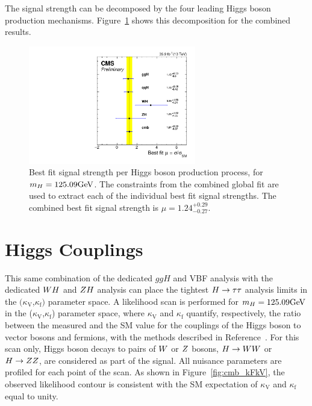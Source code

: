 The signal strength can be decomposed by the four leading Higgs boson production 
mechanisms. Figure~\ref{fig:cmb_mu_higgs_processes} shows this decomposition for
the combined results. 

\begin{figure}[!ht]
 \begin{center}
  \includegraphics[width=0.65\textwidth]{higgs_to_taus_vh/plots/combined/mu_higgs_procs.pdf}
 \end{center}
 \caption{
 Best fit signal strength per Higgs boson production process, for $m_{H} = 125.09\mathrm{GeV}$.
 The constraints from the combined global fit are used to extract each of the 
 individual best fit signal strengths. The combined best fit signal strength 
 is $\mu = 1.24 ^{+0.29} _{-0.27}$.
 }
 \label{fig:cmb_mu_higgs_processes}
\end{figure}



\section{Higgs Couplings}
This same combination of the dedicated $ggH$ and VBF analysis with 
the dedicated $WH$ and $ZH$ analysis can place the tightest
$H\to\tau\tau$ analysis limits in the $(\kappa_\text{V}$,$\kappa_\text{f})$ parameter space.
A likelihood scan is performed for $m_{H}=125.09\mathrm{GeV}$ in the ($\kappa_\text{V}$,$\kappa_\text{f}$) 
parameter space, where $\kappa_\text{V}$ and $\kappa_\text{f}$ quantify, respectively, 
the ratio between the measured and the SM value for the couplings of the Higgs boson to 
vector bosons and fermions, with the methods described in Reference~\cite{Chatrchyan:2014nva}. 
For this scan only, Higgs boson decays to pairs of $W$ or $Z$ bosons, $H\to WW$ or $H\to ZZ$,
are considered as part of 
the signal. 
All nuisance 
parameters are profiled for each point of the scan. As shown in 
Figure~\ref{fig:cmb_kFkV}, the observed likelihood contour is consistent with the SM expectation 
of $\kappa_\text{V}$ and $\kappa_\text{f}$ equal to unity.

